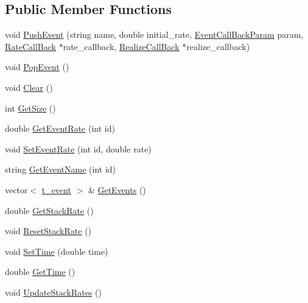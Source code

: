 \subsection*{Public Member Functions}
\begin{DoxyCompactItemize}
\item 
void \hyperlink{classelps_1_1_lab_event_stack_a0cf4b5b8bf78009aa20fc073f7ebfa6d}{Push\-Event} (string name, double initial\-\_\-rate, \hyperlink{namespaceelps_a1bd4230d698fa66dd38f0fc1cc5c2c55}{Event\-Call\-Back\-Param} param, \hyperlink{namespaceelps_a121bfb217e5fbb734b95d3f7b6653fb2}{Rate\-Call\-Back} $\ast$rate\-\_\-callback, \hyperlink{namespaceelps_adb49d5dbf827d9b190d0b1fd15e0193c}{Realize\-Call\-Back} $\ast$realize\-\_\-callback)
\item 
void \hyperlink{classelps_1_1_lab_event_stack_a6bf0e41eebd548c3c3bab27fadedbcab}{Pop\-Event} ()
\item 
void \hyperlink{classelps_1_1_lab_event_stack_a45504e766619df2f47b363ffa9512e93}{Clear} ()
\item 
int \hyperlink{classelps_1_1_lab_event_stack_a434b1f56f4914a40f191782866e413c2}{Get\-Size} ()
\item 
double \hyperlink{classelps_1_1_lab_event_stack_a5738c80975f7d26a6349d9fc98d13175}{Get\-Event\-Rate} (int id)
\item 
void \hyperlink{classelps_1_1_lab_event_stack_a4a619922dfce62966b6b5c5c5cdca866}{Set\-Event\-Rate} (int id, double rate)
\item 
string \hyperlink{classelps_1_1_lab_event_stack_a6e8e674cb0a80a798d1a1ea33412f7cd}{Get\-Event\-Name} (int id)
\item 
vector$<$ \hyperlink{structelps_1_1_lab_event_stack_1_1t__event}{t\-\_\-event} $>$ \& \hyperlink{classelps_1_1_lab_event_stack_a773198530398aa727c8f34ac71c5ba07}{Get\-Events} ()
\item 
double \hyperlink{classelps_1_1_lab_event_stack_afcdede25277a57c56d3664d4484866b6}{Get\-Stack\-Rate} ()
\item 
void \hyperlink{classelps_1_1_lab_event_stack_a466e090d7d9159983033cf732e13d461}{Reset\-Stack\-Rate} ()
\item 
void \hyperlink{classelps_1_1_lab_event_stack_ab3b53f258a8150181f8bd0d14d4d561b}{Set\-Time} (double time)
\item 
double \hyperlink{classelps_1_1_lab_event_stack_aa7fa9442c7444b4027642ad287a78218}{Get\-Time} ()
\item 
void \hyperlink{classelps_1_1_lab_event_stack_a2c69343fc9e0218238c51004d854f900}{Update\-Stack\-Rates} ()

\end{DoxyCompactItemize}
